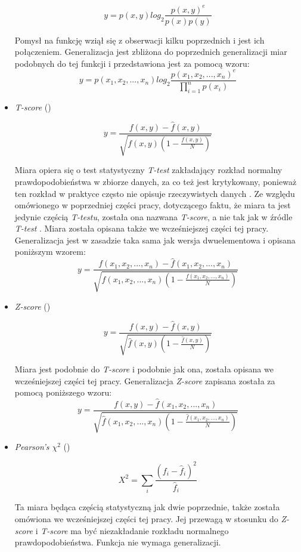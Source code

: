 \documentclass[11pt,a4paper]{llncs}
\begin{document}
\begin{itemize}
$$ y = p(x, y) log_{2}\frac{p(x, y)^{e}}{p(x)p(y)} $$


Pomysł na funkcję wziął się z obserwacji kilku poprzednich i jest ich połączeniem.
Generalizacja jest zbliżona do poprzednich generalizacji miar podobnych do tej funkcji i przedstawiona jest za pomocą wzoru:
$$ y = p(x_{1}, x_{2}, ..., x_{n}) log_{2}\frac{p(x_{1}, x_{2}, ..., x_{n})^{e}}{\prod_{i = 1}^{n} p(x_{i})} $$
	

\item \emph{T-score} (\cite[str. 18]{pecina_measures})

$$ y = \frac{ f(x, y) - \hat{f}(x, y) }{ \sqrt{ f(x, y)(1 - \frac{f(x, y)}{N}) } } $$

Miara opiera się o test statystyczny \emph{T-test} zakładający rozkład normalny prawdopodobieństwa w zbiorze danych, za co też jest krytykowany, ponieważ ten rozkład w praktyce często nie opisuje rzeczywistych danych \cite[str. 169]{mit}.
Ze względu omówionego w poprzedniej części pracy, dotyczącego faktu, że miara ta jest jedynie częścią \emph{T-testu}, została ona nazwana \emph{T-score}, a nie tak jak w źródle \emph{T-test} \cite[str. 18]{pecina_measures}.
Miara została opisana także we wcześniejszej części tej pracy.
Generalizacja jest w zasadzie taka sama jak wersja dwuelementowa i opisana poniższym wzorem:
$$ y = \frac{ f(x_{1}, x_{2}, ..., x_{n}) - \hat{f}(x_{1}, x_{2}, ..., x_{n}) }{ \sqrt{ f(x_{1}, x_{2}, ..., x_{n})(1 - \frac{f(x_{1}, x_{2}, ..., x_{n})}{N})} } $$


\item \emph{Z-score} (\cite[str. 18]{pecina_measures})

$$ y = \frac{ f(x, y) - \hat{f}(x, y) }{ \sqrt{ \hat{f}(x, y)(1 - \frac{\hat{f}(x, y)}{N}) } } $$


Miara jest podobnie do \emph{T-score} i podobnie jak ona, została opisana we wcześniejszej części tej pracy.
Generalizacja \emph{Z-score} zapisana została za pomocą poniższego wzoru:
$$ y = \frac{ f(x, y) - \hat{f}(x_{1}, x_{2}, ..., x_{n}) }{ \sqrt{ \hat{f}(x_{1}, x_{2}, ..., x_{n})(1 - \frac{\hat{f}(x_{1}, x_{2}, ..., x_{n})}{N}) } } $$



\item \emph{Pearson's \(\chi^{2}\)} (\cite[str. 18]{pecina_measures})

$$ X^2 = \sum_{i}\frac{(f_{i} - \hat{f}_{i})^2}{\hat{f}_{i}} $$


Ta miara będąca częścią statystyczną jak dwie poprzednie, także została omówiona we wcześniejszej części tej pracy.
Jej przewagą w stosunku do \emph{Z-score} i \emph{T-score} ma być niezakładanie rozkładu normalnego prawdopodobieństwa.
Funkcja nie wymaga generalizacji.



\end{itemize}
\end{document}
